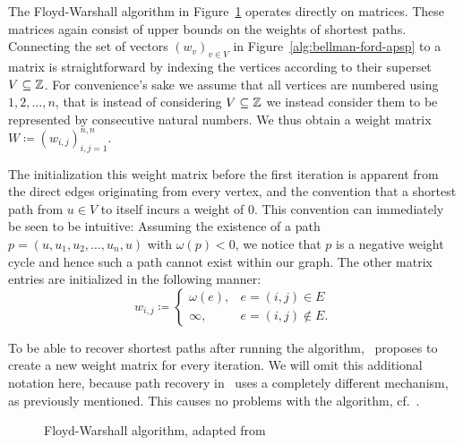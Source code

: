 The Floyd-Warshall algorithm in Figure~\ref{alg:floyd-warshall} operates directly on matrices.
These matrices again consist of upper bounds on the weights of shortest paths.
Connecting the set of vectors ${(w_v)}_{v \in V}$ in Figure~\ref{alg:bellman-ford-apsp} to a matrix is straightforward by indexing the vertices according to their superset $V \subseteq \mathbb{Z}$.
For convenience's sake we assume that all vertices are numbered using $1, 2, \dots, n$, that is instead of considering $V \subseteq \mathbb{Z}$ we instead consider them to be represented by consecutive natural numbers.
We thus obtain a weight matrix $W \coloneqq {(w_{i, j})}_{i, j = 1}^{n, n}$.

The initialization this weight matrix before the first iteration is apparent from the direct edges originating from every vertex, and the convention that a shortest path from $u \in V$ to itself incurs a weight of $0$.
This convention can immediately be seen to be intuitive: Assuming the existence of a path $p = (u, u_1, u_2, \dots, u_n, u)$ with $\omega(p) < 0$, we notice that $p$ is a negative weight cycle and hence such a path cannot exist within our graph.
The other matrix entries are initialized in the following manner:
\[
    w_{i, j} \coloneqq \begin{cases}
        \omega(e), & e = (i, j) \in E \\
        \infty, & e = (i, j) \not\in E.
    \end{cases}
\]

To be able to recover shortest paths after running the algorithm,\ \cite[Chapter~25]{Cormen2001} proposes to create a new weight matrix for every iteration.
We will omit this additional notation here, because path recovery in~\cite{Chan2007} uses a completely different mechanism, as previously mentioned.
This causes no problems with the algorithm, cf.~\cite[Exercise~25.4-5]{Cormen2001}.

\begin{figure}[ht]
    \centering
    \begin{minipage}{.6\textwidth}
        \begin{algorithm}[H]
        \end{algorithm}
    \end{minipage}
    \caption{Floyd-Warshall algorithm, adapted from~\cite[Chapter~25]{Cormen2001}\label{alg:floyd-warshall}}
\end{figure}

